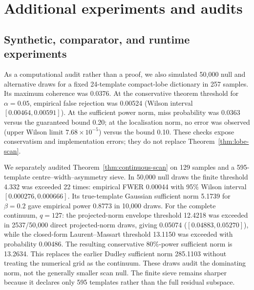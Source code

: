 \section{Additional experiments and audits}

\subsection{Synthetic, comparator, and runtime experiments}

As a computational audit rather than a proof, we also simulated 50,000 null
and alternative draws for a fixed 24-template compact-lobe dictionary in 257
samples.  Its maximum coherence was 0.0376.  At the conservative theorem
threshold for $\alpha=0.05$, empirical false rejection was 0.00524 (Wilson
interval $[0.00464,0.00591]$).  At the sufficient power norm, miss probability
was 0.0363 versus the guaranteed bound 0.20; at the localisation norm, no error
was observed (upper Wilson limit $7.68\times10^{-5}$) versus the bound 0.10.
These checks expose conservatism and implementation errors; they do not replace
Theorem~\ref{thm:lobe-scan}.

We separately audited Theorem~\ref{thm:continuous-scan} on 129 samples and a
595-template centre--width--asymmetry sieve.  In 50,000 null draws the finite
threshold 4.332 was exceeded 22 times: empirical FWER 0.00044 with 95\%
Wilson interval $[0.000276,0.000666]$.  Its true-template Gaussian sufficient norm
5.1739 for $\beta=0.2$ gave empirical power 0.8773 in 10,000 draws.  For the
complete continuum, $q=127$: the projected-norm envelope threshold 12.4218
was exceeded in 2537/50,000 direct projected-norm draws, giving 0.05074
($[0.04883,0.05270]$), while the closed-form Laurent--Massart threshold
13.1150 was exceeded with probability 0.00486.  The resulting conservative
80\%-power sufficient norm is 13.2634.  This replaces the earlier Dudley
sufficient norm 285.1103 without treating the numerical grid as the continuum.
These draws audit the dominating norm, not the generally smaller scan null.
The finite sieve remains sharper because it declares only 595 templates rather
than the full residual subspace.

